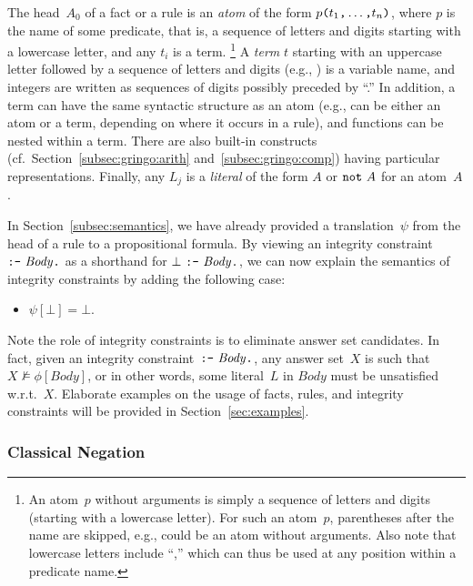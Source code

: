 \noindent
The head~$A_0$ of a fact or a rule is an \emph{atom} of the form
$p\texttt{(}t_1\texttt{,}\dots\texttt{,}t_n\texttt{)}$,
where $p$ is the name of some predicate, that is, a sequence of letters and digits
starting with a lowercase letter,
and any $t_i$ is a term.%
\footnote{An atom~$p$ without arguments is simply a sequence of letters and digits
  (starting with a lowercase letter).
  For such an atom~$p$, parentheses after the name are skipped, e.g.,
   could be an atom without arguments.
  Also note that lowercase letters include ``\code{\mus},''
  which can thus be used at any position within a predicate name.}
A \emph{term} $t$ starting with an uppercase letter followed by
a sequence of letters and digits (e.g., ) is a variable name,
and integers are written as sequences of digits possibly preceded by ``\code{-}.''
In addition, a term can have the same syntactic structure as an atom
(e.g., 
 can be either an atom or a term, depending on where it occurs in a rule),
and functions can be nested within a term.
There are also built-in constructs
(cf.\ Section~\ref{subsec:gringo:arith} and~\ref{subsec:gringo:comp})
having particular representations.
Finally, any $L_j$ is a \emph{literal} of the form $A$ or $\texttt{not}~A$
for an atom~$A$.

In Section~\ref{subsec:semantics},
we have already provided a translation~$\psi$
from the head of a rule to a propositional formula.
By viewing an integrity constraint
$\texttt{:-}~\mathit{Body}\texttt{.}$ as a shorthand for $\bot~\texttt{:-}~\mathit{Body}\texttt{.}$,
we can now explain the semantics of integrity constraints by adding the following case:
\begin{itemize}
\item $\psi[\bot]=\bot$.
\end{itemize}
Note the role of integrity constraints is to eliminate answer set candidates.
In fact, given an integrity constraint~$\texttt{:-}~\mathit{Body}\texttt{.}$,
any answer set~$X$ is such that $X\not\models\phi[\mathit{Body}]$, or
in other words, some literal~$L$ in $\mathit{Body}$ must be unsatisfied w.r.t.~$X$.
Elaborate examples on the usage of facts, rules, and integrity constraints
will be provided in Section~\ref{sec:examples}.


\subsubsection{Classical Negation}\label{subsec:gringo:negation}


